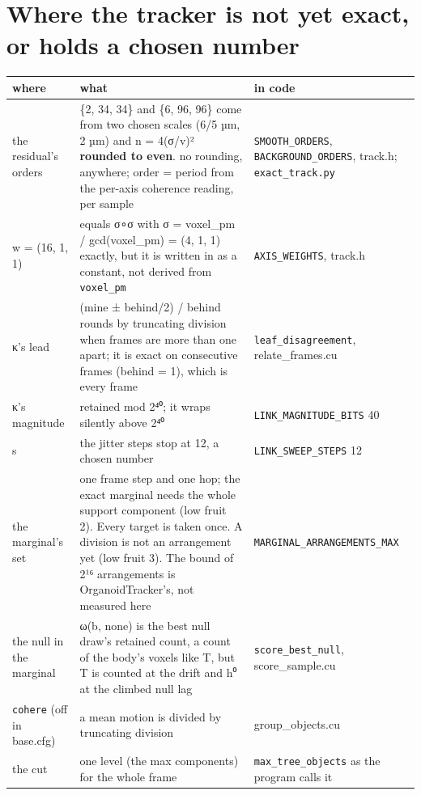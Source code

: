 \section{\texorpdfstring{Where the tracker is not yet exact, or holds a chosen number}{Where the tracker is not yet exact, or holds a chosen number}}

{\small
\setlength{\tabcolsep}{6pt}
\begin{longtable}{>{\RaggedRight\arraybackslash}p{}>{\RaggedRight\arraybackslash}p{}>{\RaggedRight\arraybackslash}p{}}
\toprule
where & what & in code \\
\midrule
\endhead
the residual's orders & \{2, 34, 34\} and \{6, 96, 96\} come from two chosen scales (6/5 µm, 2 µm) and n = 4(σ/v)² \textbf{rounded to even}. no rounding, anywhere; order = period from the per-axis coherence reading, per sample & \texttt{SMOOTH\_\allowbreak{}ORDERS}, \texttt{BACKGROUND\_\allowbreak{}ORDERS}, track.h; \texttt{exact\_\allowbreak{}track.\allowbreak{}py} \\
w = (16, 1, 1) & equals σ∘σ with σ = voxel\_\allowbreak{}pm / gcd(voxel\_\allowbreak{}pm) = (4, 1, 1) exactly, but it is written in as a constant, not derived from \texttt{voxel\_\allowbreak{}pm} & \texttt{AXIS\_\allowbreak{}WEIGHTS}, track.h \\
κ's lead & (mine ± behind/2) / behind rounds by truncating division when frames are more than one apart; it is exact on consecutive frames (behind = 1), which is every frame & \texttt{leaf\_\allowbreak{}disagreement}, relate\_\allowbreak{}frames.cu \\
κ's magnitude & retained mod 2⁴⁰; it wraps silently above 2⁴⁰ & \texttt{LINK\_\allowbreak{}MAGNITUDE\_\allowbreak{}BITS} 40 \\
s & the jitter steps stop at 12, a chosen number & \texttt{LINK\_\allowbreak{}SWEEP\_\allowbreak{}STEPS} 12 \\
the marginal's set & one frame step and one hop; the exact marginal needs the whole support component (low fruit 2). Every target is taken once. A division is not an arrangement yet (low fruit 3). The bound of 2¹⁶ arrangements is OrganoidTracker's, not measured here & \texttt{MARGINAL\_\allowbreak{}ARRANGEMENTS\_\allowbreak{}MAX} \\
the null in the marginal & ω(b, none) is the best null draw's retained count, a count of the body's voxels like T, but T is counted at the drift and h⁰ at the climbed null lag & \texttt{score\_\allowbreak{}best\_\allowbreak{}null}, score\_\allowbreak{}sample.cu \\
\texttt{cohere} (off in base.cfg) & a mean motion is divided by truncating division & group\_\allowbreak{}objects.cu \\
the cut & one level (the max components) for the whole frame & \texttt{max\_\allowbreak{}tree\_\allowbreak{}objects} as the program calls it \\
\bottomrule
\end{longtable}
}

